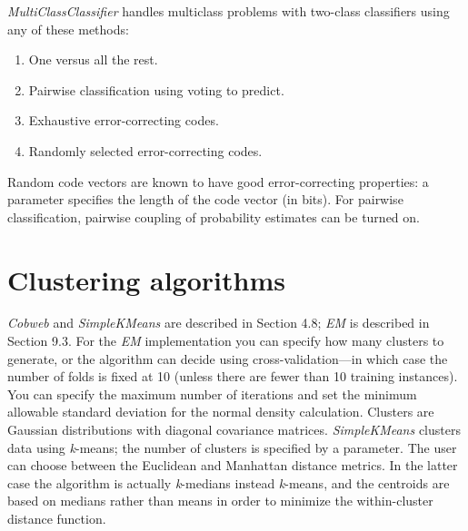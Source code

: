 \textit{MultiClassClassifier} handles multiclass problems with
two-class classifiers using any of these methods:

\begin{enumerate}
\item One versus all the rest.
\item Pairwise classification using voting to predict.
\item Exhaustive error-correcting codes.
\item Randomly selected error-correcting codes.
\end{enumerate}

Random code vectors are known to have good error-correcting
properties: a parameter specifies the length of the code vector (in
bits). For pairwise classification, pairwise coupling of probability
estimates can be turned on.

\section{Clustering algorithms}

\textit{Cobweb} and \textit{SimpleKMeans} are described in Section
4.8; \textit{EM} is described in Section 9.3. For the \textit{EM}
implementation you can specify how many clusters to generate, or the
algorithm can decide using cross-validation—in which case the number
of folds is fixed at 10 (unless there are fewer than 10 training
instances). You can specify the maximum number of iterations and set
the minimum allowable standard deviation for the normal density
calculation. Clusters are Gaussian distributions with diagonal
covariance matrices. \textit{SimpleKMeans} clusters data using
\textit{k}-means; the number of clusters is specified by a
parameter. The user can choose between the Euclidean and Manhattan
distance metrics. In the latter case the algorithm is actually
\textit{k}-medians instead \textit{k}-means, and the centroids are
based on medians rather than means in order to minimize the
within-cluster distance function.

